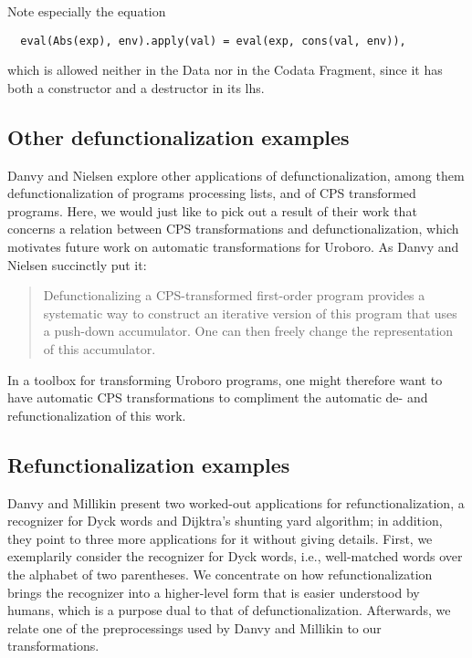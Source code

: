 Note especially the equation

\begin{lstlisting}
  eval(Abs(exp), env).apply(val) = eval(exp, cons(val, env)),
\end{lstlisting}

which is allowed neither in the Data nor in the Codata Fragment, since it has both a constructor and a destructor in its lhs.

\subsection{Other defunctionalization examples}
\label{ssec:defuncex}

Danvy and Nielsen\cite{danvy01defunctionalizations} explore other applications of defunctionalization, among them defunctionalization of programs processing lists, and of CPS transformed programs. Here, we would just like to pick out a result of their work that concerns a relation between CPS transformations and defunctionalization, which motivates future work on automatic transformations for Uroboro. As Danvy and Nielsen succinctly put it:

\blockcquote[20]{danvy01defunctionalization}{Defunctionalizing a CPS-transformed first-order program provides a systematic way to construct an iterative version of this program that uses a push-down accumulator. One can then freely change the representation of this accumulator.}

In a toolbox for transforming Uroboro programs, one might therefore want to have automatic CPS transformations to compliment the automatic de- and refunctionalization of this work.

\subsection{Refunctionalization examples}
\label{ssec:refuncex}

Danvy and Millikin\cite{danvy09refunctionalization} present two worked-out applications for refunctionalization, a recognizer for Dyck words and Dijktra's shunting yard algorithm; in addition, they point to three more applications for it without giving details. First, we exemplarily consider the recognizer for Dyck words, i.e., well-matched words over the alphabet of two parentheses. We concentrate on how refunctionalization brings the recognizer into a higher-level form that is easier understood by humans, which is a purpose dual to that of defunctionalization. Afterwards, we relate one of the preprocessings used by Danvy and Millikin to our transformations.

